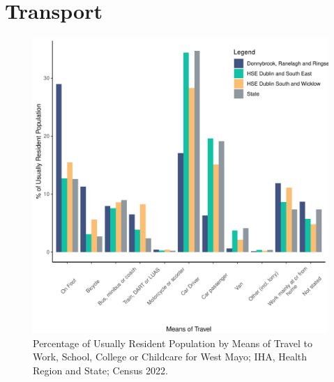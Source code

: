 \documentclass{article}
\begin{document}
\section{Transport}\label{sect:Trans}
\begin{figure}[H]
	\centering
	\includegraphics[width = 120mm]{../figures/TravelED.pdf}
	\caption{Percentage of Usually Resident Population by Means of Travel to Work, School, College or Childcare for West Mayo; IHA, Health Region and State; Census 2022.}
	\label{fig:vbnv}
	\end{figure}
\end{document}
